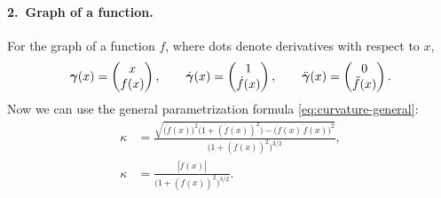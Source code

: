 \paragraph{2.\ Graph of a function.}
For the graph of a function $f$, where dots denote derivatives with
respect to $x$,
\[
  \bm{\gamma}(x) = \begin{pmatrix} x \\ f(x) \end{pmatrix} ,
  \qquad
  \dot{\bm{\gamma}}(x) = \begin{pmatrix} 1 \\ \dot{f}(x) \end{pmatrix} ,
  \qquad
  \ddot{\bm{\gamma}}(x) = \begin{pmatrix} 0 \\ \ddot{f}(x) \end{pmatrix} .
\]
Now we can use the general parametrization formula
\eqref{eq:curvature-general}:
\begin{align*}
  \kappa &= \frac{\sqrt{ \bigl(\ddot{f}(x)\bigr)^2 \bigl(1 + (\dot{f}(x))^2\bigr)
                       - \bigl(\dot{f}(x)\,\ddot{f}(x)\bigr)^2 }}
                 {\bigl(1 + (\dot{f}(x))^2\bigr)^{3/2}} , \\
  \kappa &= \frac{|\ddot{f}(x)|}{\bigl(1 + (\dot{f}(x))^2\bigr)^{3/2}} .
\end{align*}

